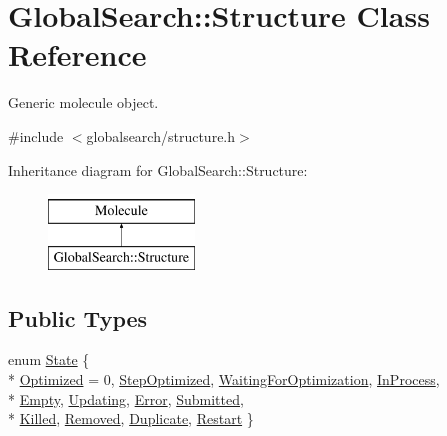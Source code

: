 \hypertarget{classGlobalSearch_1_1Structure}{}\section{Global\+Search\+:\+:Structure Class Reference}
\label{classGlobalSearch_1_1Structure}


Generic molecule object.  




{\ttfamily \#include $<$globalsearch/structure.\+h$>$}

Inheritance diagram for Global\+Search\+:\+:Structure\+:\begin{figure}[H]
\begin{center}
\leavevmode
\includegraphics[height=2.000000cm]{classGlobalSearch_1_1Structure}
\end{center}
\end{figure}
\subsection*{Public Types}
\begin{DoxyCompactItemize}
\item 
enum \hyperlink{classGlobalSearch_1_1Structure_a3f1e44cb4f603fe1b3fbc8e813535917}{State} \{ \\*
\hyperlink{classGlobalSearch_1_1Structure_a3f1e44cb4f603fe1b3fbc8e813535917a75ed0969285b99dc1e54c654428be5e0}{Optimized} = 0, 
\hyperlink{classGlobalSearch_1_1Structure_a3f1e44cb4f603fe1b3fbc8e813535917ae572101eab4010061be0073888fbee39}{Step\+Optimized}, 
\hyperlink{classGlobalSearch_1_1Structure_a3f1e44cb4f603fe1b3fbc8e813535917ad4d8f76770421b6ab8d39f60e280a0a0}{Waiting\+For\+Optimization}, 
\hyperlink{classGlobalSearch_1_1Structure_a3f1e44cb4f603fe1b3fbc8e813535917a4f451a4c3de6ed294e1c7d06e5b1d24c}{In\+Process}, 
\\*
\hyperlink{classGlobalSearch_1_1Structure_a3f1e44cb4f603fe1b3fbc8e813535917a1639a0fd1ec7f1bba6cdaf73a2e76582}{Empty}, 
\hyperlink{classGlobalSearch_1_1Structure_a3f1e44cb4f603fe1b3fbc8e813535917ae64ed17fe917f0b8fd679078b5b12447}{Updating}, 
\hyperlink{classGlobalSearch_1_1Structure_a3f1e44cb4f603fe1b3fbc8e813535917a6b33b578b7e228f289720292019a998a}{Error}, 
\hyperlink{classGlobalSearch_1_1Structure_a3f1e44cb4f603fe1b3fbc8e813535917a5a0e4ad5830e2c3a9b045da79098b6c7}{Submitted}, 
\\*
\hyperlink{classGlobalSearch_1_1Structure_a3f1e44cb4f603fe1b3fbc8e813535917acd16cf0031d5e5b522b61618fd73fdc1}{Killed}, 
\hyperlink{classGlobalSearch_1_1Structure_a3f1e44cb4f603fe1b3fbc8e813535917ac5686d195648a0800584c59d034e8be0}{Removed}, 
\hyperlink{classGlobalSearch_1_1Structure_a3f1e44cb4f603fe1b3fbc8e813535917a1cd89f1eb6cab53ae2bb1b2ad64dfe72}{Duplicate}, 
\hyperlink{classGlobalSearch_1_1Structure_a3f1e44cb4f603fe1b3fbc8e813535917a99c42cb7635428e83d759cdae79209ec}{Restart}
 \}
\end{DoxyCompactItemize}
